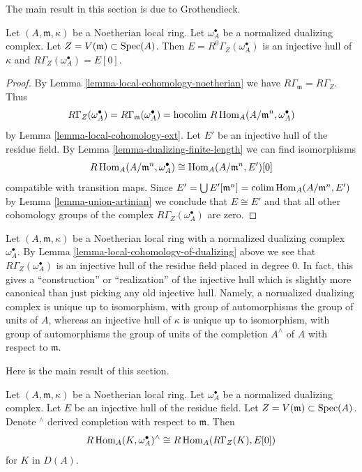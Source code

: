 \noindent
The main result in this section is due to Grothendieck.

\begin{lemma}
\label{lemma-local-cohomology-of-dualizing}
Let $(A, \mathfrak m, \kappa)$ be a Noetherian local ring.
Let $\omega_A^\bullet$ be a normalized dualizing complex.
Let $Z = V(\mathfrak m) \subset \mathop{\mathrm{Spec}}(A)$.
Then $E = R^0\Gamma_Z(\omega_A^\bullet)$ is an injective hull of
$\kappa$ and $R\Gamma_Z(\omega_A^\bullet) = E[0]$.
\end{lemma}

\begin{proof}
By Lemma \ref{lemma-local-cohomology-noetherian} we have
$R\Gamma_{\mathfrak m} = R\Gamma_Z$. Thus
$$
R\Gamma_Z(\omega_A^\bullet) =
R\Gamma_{\mathfrak m}(\omega_A^\bullet) =
\text{hocolim}\ R\mathop{\mathrm{Hom}}\nolimits_A(A/\mathfrak m^n, \omega_A^\bullet)
$$
by Lemma \ref{lemma-local-cohomology-ext}. Let $E'$ be an injective
hull of the residue field.
By Lemma \ref{lemma-dualizing-finite-length}
we can find isomorphisms
$$
R\mathop{\mathrm{Hom}}\nolimits_A(A/\mathfrak m^n, \omega_A^\bullet) \cong \mathop{\mathrm{Hom}}\nolimits_A(A/\mathfrak m^n, E')[0]
$$
compatible with transition maps. Since
$E' = \bigcup E'[\mathfrak m^n] = \mathop{\mathrm{colim}}\nolimits \mathop{\mathrm{Hom}}\nolimits_A(A/\mathfrak m^n, E')$
by Lemma \ref{lemma-union-artinian}
we conclude that $E \cong E'$ and that all other cohomology
groups of the complex $R\Gamma_Z(\omega_A^\bullet)$ are zero.
\end{proof}

\begin{remark}
\label{remark-specific-injective-hull}
Let $(A, \mathfrak m, \kappa)$ be a Noetherian local ring
with a normalized dualizing complex $\omega_A^\bullet$.
By Lemma \ref{lemma-local-cohomology-of-dualizing}
above we see that $R\Gamma_Z(\omega_A^\bullet)$
is an injective hull of the residue field placed in degree $0$.
In fact, this gives a ``construction'' or ``realization''
of the injective hull which is slightly more canonical than
just picking any old injective hull. Namely, a normalized
dualizing complex is unique up to isomorphism, with group
of automorphisms the group of units of $A$, whereas an
injective hull of $\kappa$ is unique up to isomorphism, with
group of automorphisms the group of units of the completion
$A^\wedge$ of $A$ with respect to $\mathfrak m$.
\end{remark}

\noindent
Here is the main result of this section.

\begin{theorem}
\label{theorem-local-duality}
Let $(A, \mathfrak m, \kappa)$ be a Noetherian local ring.
Let $\omega_A^\bullet$ be a normalized dualizing complex.
Let $E$ be an injective hull of the residue field.
Let $Z = V(\mathfrak m) \subset \mathop{\mathrm{Spec}}(A)$.
Denote ${}^\wedge$ derived completion with respect to $\mathfrak m$.
Then
$$
R\mathop{\mathrm{Hom}}\nolimits_A(K, \omega_A^\bullet)^\wedge \cong R\mathop{\mathrm{Hom}}\nolimits_A(R\Gamma_Z(K), E[0])
$$
for $K$ in $D(A)$.
\end{theorem}

